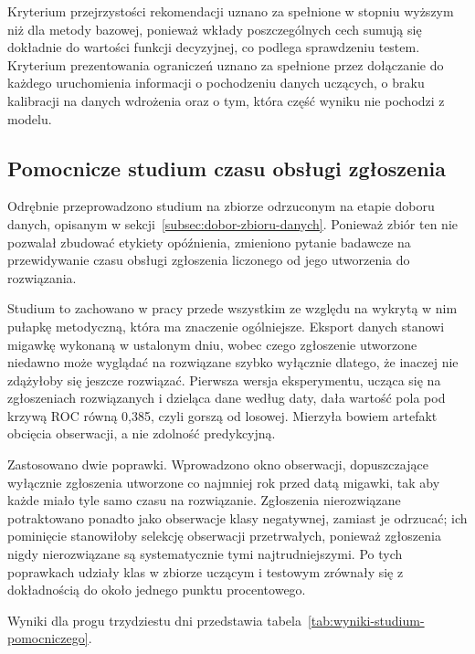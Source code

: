 Kryterium przejrzystości rekomendacji uznano za spełnione w stopniu wyższym niż dla metody bazowej, ponieważ wkłady poszczególnych cech sumują się dokładnie do wartości funkcji decyzyjnej, co podlega sprawdzeniu testem. Kryterium prezentowania ograniczeń uznano za spełnione przez dołączanie do każdego uruchomienia informacji o pochodzeniu danych uczących, o braku kalibracji na danych wdrożenia oraz o tym, która część wyniku nie pochodzi z modelu.

\subsection{Pomocnicze studium czasu obsługi zgłoszenia}

Odrębnie przeprowadzono studium na zbiorze odrzuconym na etapie doboru danych, opisanym w sekcji~\ref{subsec:dobor-zbioru-danych}. Ponieważ zbiór ten nie pozwalał zbudować etykiety opóźnienia, zmieniono pytanie badawcze na przewidywanie czasu obsługi zgłoszenia liczonego od jego utworzenia do rozwiązania.

Studium to zachowano w pracy przede wszystkim ze względu na wykrytą w nim pułapkę metodyczną, która ma znaczenie ogólniejsze. Eksport danych stanowi migawkę wykonaną w ustalonym dniu, wobec czego zgłoszenie utworzone niedawno może wyglądać na rozwiązane szybko wyłącznie dlatego, że inaczej nie zdążyłoby się jeszcze rozwiązać. Pierwsza wersja eksperymentu, ucząca się na zgłoszeniach rozwiązanych i dzieląca dane według daty, dała wartość pola pod krzywą ROC równą 0,385, czyli gorszą od losowej. Mierzyła bowiem artefakt obcięcia obserwacji, a nie zdolność predykcyjną.

Zastosowano dwie poprawki. Wprowadzono okno obserwacji, dopuszczające wyłącznie zgłoszenia utworzone co najmniej rok przed datą migawki, tak aby każde miało tyle samo czasu na rozwiązanie. Zgłoszenia nierozwiązane potraktowano ponadto jako obserwacje klasy negatywnej, zamiast je odrzucać; ich pominięcie stanowiłoby selekcję obserwacji przetrwałych, ponieważ zgłoszenia nigdy nierozwiązane są systematycznie tymi najtrudniejszymi. Po tych poprawkach udziały klas w zbiorze uczącym i testowym zrównały się z dokładnością do około jednego punktu procentowego.

Wyniki dla progu trzydziestu dni przedstawia tabela~\ref{tab:wyniki-studium-pomocniczego}.

